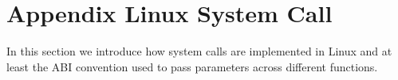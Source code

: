 \chapter{Appendix  Linux System Call}
\label{appendix:A}
In this section we introduce how system calls are implemented in Linux and 
at least the ABI convention used to pass parameters across different functions.



